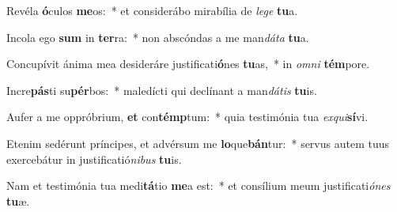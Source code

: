 \item Revéla \textbf{ó}culos \textbf{me}os:~* et considerábo mirabília de \textit{le}\textit{ge} \textbf{tu}a.
\item Incola ego \textbf{sum} in \textbf{ter}ra:~* non abscóndas a me man\textit{dá}\textit{ta} \textbf{tu}a.
\item Concupívit ánima mea desideráre justificati\textbf{ó}nes \textbf{tu}as,~* in \textit{om}\textit{ni} \textbf{tém}pore.
\item Incre\textbf{pás}ti su\textbf{pér}bos:~* maledícti qui declínant a man\textit{dá}\textit{tis} \textbf{tu}is.
\item Aufer a me oppróbrium, \textbf{et} con\textbf{témp}tum:~* quia testimónia tua \textit{ex}\textit{qui}\textbf{sí}vi.
\item Etenim sedérunt príncipes, et advérsum me \textbf{lo}que\textbf{bán}tur:~* servus autem tuus exercebátur in justificatió\textit{ni}\textit{bus} \textbf{tu}is.
\item Nam et testimónia tua medi\textbf{tá}tio \textbf{me}a est:~* et consílium meum justificati\textit{ó}\textit{nes} \textbf{tu}æ.
